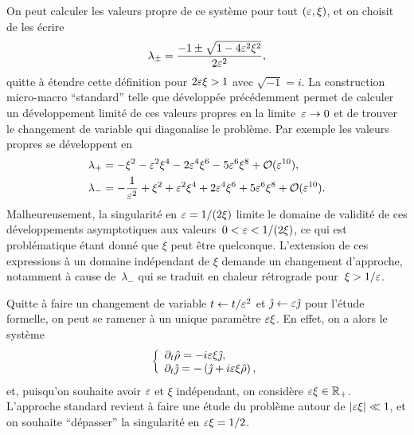 On peut calculer les valeurs propre de ce système pour tout $(\varepsilon, \xi)$, et on choisit de les écrire
\begin{equation*}
    \lambda_{\pm} = \frac{-1 \pm \sqrt{1 - 4\varepsilon^2 \xi^2}}{2\varepsilon^2} ,
\end{equation*}
quitte à étendre cette définition pour $2\varepsilon\xi > 1$ avec $\sqrt{-1} = i$. La construction micro-macro \enquote{standard} telle que développée précédemment permet de calculer un développement limité de ces valeurs propres en la limite~$\varepsilon \rightarrow 0$ et de trouver le changement de variable qui diagonalise le problème. Par exemple les valeurs propres se développent en 
\begin{align*} &
    \lambda_+ = -\xi^2 - \varepsilon^2\xi^4 - 2\varepsilon^4\xi^6 
    - 5\varepsilon^6\xi^8 + \mathcal{O}(\varepsilon^{10}) ,
    \\ &
    \lambda_- 
    = -\frac{1}{\varepsilon^2} + \xi^2 + \varepsilon^2\xi^4 + 2\varepsilon^4\xi^6 
    + 5\varepsilon^6\xi^8 + \mathcal{O}(\varepsilon^{10}) .
\end{align*}
Malheureusement, la singularité en $\varepsilon = 1/(2\xi)$ limite le domaine de validité de ces développements asymptotiques aux valeurs~$0 < \varepsilon < 1/(2\xi)$, ce qui est problématique étant donné que $\xi$ peut être quelconque. L'extension de ces expressions à un domaine indépendant de $\xi$ demande un changement d'approche, notamment à cause de~$\lambda_-$ qui se traduit en chaleur rétrograde pour~$\xi > 1/\varepsilon$. 

Quitte à faire un changement de variable $t \leftarrow t/\varepsilon^2$ et $\hat{\jmath} \leftarrow \varepsilon \hat{\jmath}$ pour l'étude formelle, on peut se ramener à un unique paramètre $\varepsilon\xi$. En effet, on a alors le système
\begin{equation} \label{ext:pb:rescaled_telegraph}
    \left\{ \begin{array}{l} \displaystyle 
        \partial_t \hat{\rho} = - i\varepsilon\xi \hat{\jmath} ,
        \\ \displaystyle
        \partial_t \hat{\jmath} 
        = -\left( \hat{\jmath} + i\varepsilon\xi \hat{\rho} \right) ,
    \end{array} \right .
\end{equation}
et, puisqu'on souhaite avoir $\varepsilon$ et $\xi$ indépendant, on considère $\varepsilon\xi \in \mathbb{R}_+$. L'approche standard revient à faire une étude du problème autour de $|\varepsilon\xi| \ll 1$, et on souhaite \enquote{dépasser} la singularité en $\varepsilon\xi = 1/2$. 

